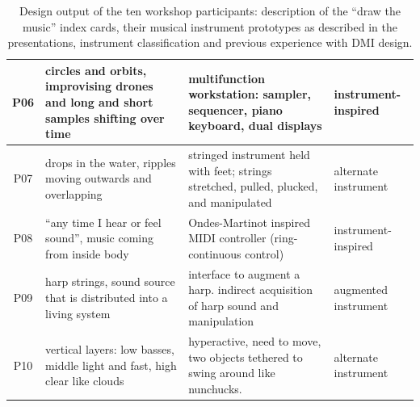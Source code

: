 \documentclass[Sullivan_phd_thesis.tex]{subfiles}
\begin{document}
\begin{table}[htbp]
\begin{centering}
\begin{tabular}{ c L{5.1cm} L{5.8cm} C{2.5cm} }
            P06 &
            circles and orbits, improvising drones and long and short samples shifting over time &
            multifunction workstation: sampler, sequencer, piano keyboard, dual displays &
            instrument-inspired \\ \hline
            
            P07 &
            drops in the water, ripples moving outwards and overlapping &
            stringed instrument held with feet; strings stretched, pulled, plucked, and manipulated &
            alternate instrument \\ \hline
            
            P08 &
            ``any time I hear or feel sound'', music coming from inside body &
            Ondes-Martinot inspired MIDI controller (ring-continuous control) &
            instrument-inspired \\ \hline
            
            P09 &
            harp strings, sound source that is distributed into a living system &
            interface to augment a harp. indirect acquisition of harp sound and manipulation &
            augmented instrument \\ \hline
            
            P10 &
            vertical layers: low basses, middle light and fast, high clear like clouds &
            hyperactive, need to move, two objects tethered to swing around like nunchucks. &
            alternate instrument \\ 
            \bottomrule
            
        \end{tabular}
        \caption[Design for Performance workshop: Design outputs]{Design output of the ten workshop participants: description of the ``draw the music'' index cards, their musical instrument prototypes as described in the presentations, instrument classification and previous experience with DMI design.}
        \label{ch3-tab:participant-outputs}
    \end{centering}
\end{table}

\end{document}
